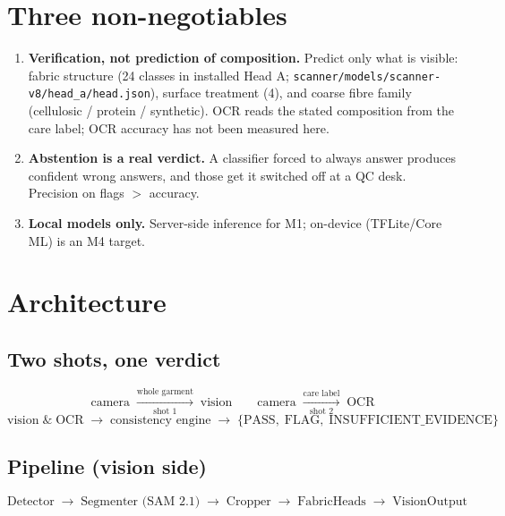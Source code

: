 \documentclass[11pt,a4paper]{article}
\begin{document}
\section{Three non-negotiables}

\begin{enumerate}[leftmargin=*]
  \item \textbf{Verification, not prediction of composition.} Predict only what is
        visible: fabric structure (24 classes in installed Head A;
        \texttt{scanner/models/scanner-v8/head\_a/head.json}), surface treatment (4),
        and coarse fibre family (cellulosic / protein / synthetic). OCR reads the
        stated composition from the care label; OCR accuracy has not been measured here.
  \item \textbf{Abstention is a real verdict.} A classifier forced to always answer
        produces confident wrong answers, and those get it switched off at a QC desk.
        Precision on flags $>$ accuracy.
  \item \textbf{Local models only.} Server-side inference for M1; on-device
        (TFLite/Core ML) is an M4 target.
\end{enumerate}

\section{Architecture}

\subsection{Two shots, one verdict}

\[
\text{camera} \;\xrightarrow[\text{shot 1}]{\text{whole garment}}\; \text{vision}
\qquad
\text{camera} \;\xrightarrow[\text{shot 2}]{\text{care label}}\; \text{OCR}
\]
\[
\text{vision} \;\&\; \text{OCR} \;\longrightarrow\; \text{consistency engine}
\;\longrightarrow\; \{\text{PASS},\;\text{FLAG},\;\text{INSUFFICIENT\_EVIDENCE}\}
\]

\subsection{Pipeline (vision side)}

\[
\text{Detector} \;\to\; \text{Segmenter (SAM 2.1)} \;\to\; \text{Cropper}
\;\to\; \text{FabricHeads} \;\to\; \text{VisionOutput}
\]
\end{document}
